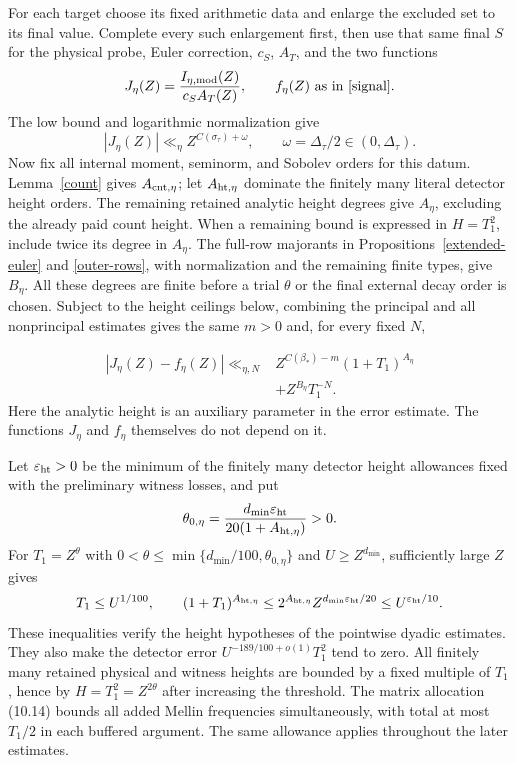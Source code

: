 \documentclass[10pt,reqno,a4paper]{amsart}
\theoremstyle{remark}
\newcommand{\eps}{\varepsilon}
\newcommand{\st}{\sigma_\tau}
\newcommand{\bp}{\beta_*}
\begin{document}
For each target choose its fixed arithmetic data and enlarge
the excluded set to its final value. Complete every such
enlargement first, then use that same final $S$ for the physical
probe, Euler correction, $c_S$, $A_T$, and the two functions
\[
            J_\eta(Z)=\frac{I_{\eta,\mathrm{mod}}(Z)}{c_SA_T(Z)},
            \qquad f_\eta(Z)\text{ as in \eqref{signal}}.
\]
The low bound and logarithmic normalization give
\begin{equation}\label{normalized-low}
 |J_\eta(Z)|\ll_\eta Z^{C(\st)+\omega},
 \qquad \omega=\Delta_\tau/2\in(0,\Delta_\tau).
\end{equation}
Now fix all internal moment, seminorm, and Sobolev orders for this
datum. Lemma~\ref{count} gives $A_{{\rm cnt},\eta}$; let
$A_{{\rm ht},\eta}$ dominate the finitely many literal detector
height orders. The remaining retained analytic height degrees give
$A_\eta$, excluding the already paid count height. When a remaining
bound is expressed in $H=T_1^2$, include twice its degree in $A_\eta$.
The full-row majorants in Propositions~\ref{extended-euler} and
\ref{outer-rows}, with normalization and the remaining finite types,
give $B_\eta$. All these degrees are finite before a trial $\theta$
or the final external decay order is chosen.
Subject to the height ceilings below, combining the principal and all
nonprincipal estimates gives the same $m>0$ and, for every fixed $N$,

\begin{equation}\label{comparison-with-tail}
\begin{aligned}
 |J_\eta(Z)-f_\eta(Z)|\ll_{\eta,N}{}&
       Z^{C(\bp)-m}(1+T_1)^{A_\eta}\\
       &+Z^{B_\eta}T_1^{-N}.
\end{aligned}
\end{equation}
Here the analytic height is an auxiliary parameter in the error
estimate. The functions $J_\eta$ and $f_\eta$ themselves do not
depend on it.

Let $\eps_{\rm ht}>0$ be the minimum of the finitely many detector
height allowances fixed with the preliminary witness losses, and put
\[
 \theta_{0,\eta}=
   \frac{d_{\min}\eps_{\rm ht}}{20(1+A_{{\rm ht},\eta})}>0.
\]
For $T_1=Z^\theta$ with
$0<\theta\le\min\{d_{\min}/100,\theta_{0,\eta}\}$ and
$U\ge Z^{d_{\min}}$, sufficiently large $Z$ gives
\[
 T_1\le U^{1/100},\qquad
 (1+T_1)^{A_{{\rm ht},\eta}}
 \le2^{A_{{\rm ht},\eta}}Z^{d_{\min}\eps_{\rm ht}/20}
 \le U^{\eps_{\rm ht}/10}.
\]
These inequalities verify the height hypotheses of the pointwise
dyadic estimates. They also make the detector error
$U^{-189/100+o(1)}T_1^2$ tend to zero. All finitely many retained
physical and witness heights are bounded by a fixed multiple of
$T_1$, hence by $H=T_1^2=Z^{2\theta}$ after increasing the threshold.
The matrix allocation (10.14) bounds all added Mellin frequencies
simultaneously, with total at most $T_1/2$ in each buffered argument.
The same allowance applies throughout the later estimates.
\end{document}
